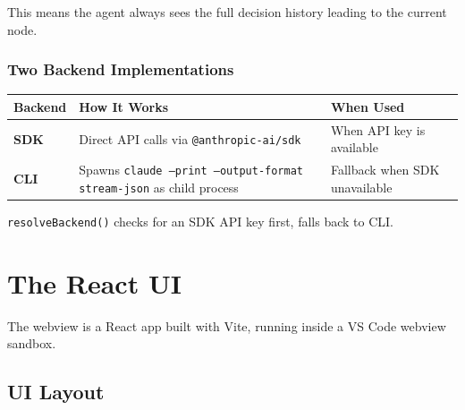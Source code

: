 \documentclass[12pt, a4paper]{article}
\begin{document}
This means the agent always sees the full decision history leading to the current node.

\subsubsection{Two Backend Implementations}

\begin{table}[H]
\centering
\begin{tabular}{@{}p{2.5cm}p{5cm}p{5.5cm}@{}}
\toprule
\textbf{Backend} & \textbf{How It Works} & \textbf{When Used} \\
\midrule
\textbf{SDK} & Direct API calls via \texttt{@anthropic-ai/sdk} & When API key is available \\
\textbf{CLI} & Spawns \texttt{claude --print --output-format stream-json} as child process & Fallback when SDK unavailable \\
\bottomrule
\end{tabular}
\end{table}

\texttt{resolveBackend()} checks for an SDK API key first, falls back to CLI.

\newpage

\section{The React UI}

The webview is a React app built with Vite, running inside a VS Code webview sandbox.

\subsection{UI Layout}
\end{document}
